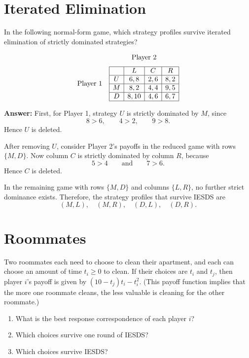 \documentclass[12pt,a4paper]{article}
\begin{document}
\section{Iterated Elimination}

In the following normal-form game, which strategy profiles survive iterated elimination of strictly dominated strategies?

\[
\begin{array}{c@{\hspace{1em}}c}
& \text{Player 2} \\[0.7em]
\text{Player 1} &
\begin{array}{|c|c|c|c|}
  \hline
  & L & C & R \\
  \hline
  U & 6,8 & 2,6 & 8,2 \\
  \hline
  M & 8,2 & 4,4 & 9,5 \\
  \hline
  D & 8,10 & 4,6 & 6,7 \\
  \hline
\end{array}
\end{array}
\]

\vspace{0.5cm}

\noindent\textbf{Answer:} First, for Player 1, strategy $U$ is strictly dominated by $M$, since
  \[
    8>6,\qquad 4>2,\qquad 9>8.
  \]
Hence $U$ is deleted.

After removing $U$, consider Player 2's payoffs in the reduced game with rows $\{M,D\}$. Now column $C$ is strictly dominated by column $R$, because
\[
  5>4\qquad \text{and} \qquad 7>6.
\]
Hence $C$ is deleted.

In the remaining game with rows $\{M,D\}$ and columns $\{L,R\}$, no further strict dominance exists. Therefore, the strategy profiles that survive IESDS are
\[
  (M,L),\quad (M,R),\quad (D,L),\quad (D,R).
\]

\section{Roommates}
Two roommates each need to choose to clean their apartment, and each can choose an amount of time $t_i \ge 0$ to clean. If their choices are $t_i$ and $t_j$, then player $i$’s payoff is given by $(10 - t_j)t_i - t_i^2$. (This payoff function implies that the more one roommate cleans, the less valuable is cleaning for the other roommate.)
\begin{enumerate}[label=(\alph*)]
  \item What is the best response correspondence of each player $i$?
  \item Which choices survive one round of IESDS?
  \item Which choices survive IESDS?
\end{enumerate}
\end{document}
